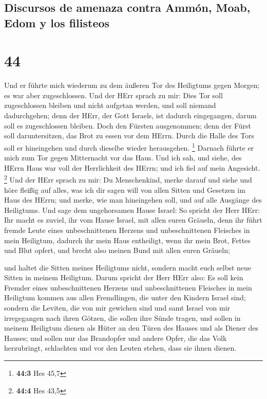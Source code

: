 \hypertarget{discursos-de-amenaza-contra-ammuxf3n-moab-edom-y-los-filisteos}{%
\subsection{Discursos de amenaza contra Ammón, Moab, Edom y los
filisteos}\label{discursos-de-amenaza-contra-ammuxf3n-moab-edom-y-los-filisteos}}

\hypertarget{section-43}{%
\section{44}\label{section-43}}

 Und er führte mich wiederum zu dem äußeren Tor des
Heiligtums gegen Morgen; es war aber zugeschlossen.  Und
der HErr sprach zu mir: Dies Tor soll zugeschlossen bleiben und nicht
aufgetan werden, und soll niemand dadurchgehen; denn der HErr, der Gott
Israels, ist dadurch eingegangen, darum soll es zugeschlossen bleiben.
 Doch den Fürsten ausgenommen; denn der Fürst soll
daruntersitzen, das Brot zu essen vor dem HErrn. Durch die Halle des
Tors soll er hineingehen und durch dieselbe wieder herausgehen.
\footnote{\textbf{44:3} Hes 45,7}  Darnach führte er mich
zum Tor gegen Mitternacht vor das Haus. Und ich sah, und siehe, des
HErrn Haus war voll der Herrlichkeit des HErrn; und ich fiel auf mein
Angesicht. \footnote{\textbf{44:4} Hes 43,5}  Und der HErr
sprach zu mir: Du Menschenkind, merke darauf und siehe und höre fleißig
auf alles, was ich dir sagen will von allen Sitten und Gesetzen im Haus
des HErrn; und merke, wie man hineingehen soll, und auf alle Ausgänge
des Heiligtums.  Und sage dem ungehorsamen Hause Israel:
So spricht der Herr HErr: Ihr macht es zuviel, ihr vom Hause Israel, mit
allen euren Gräueln,  denn ihr führt fremde Leute eines
unbeschnittenen Herzens und unbeschnittenen Fleisches in mein Heiligtum,
dadurch ihr mein Haus entheiligt, wenn ihr mein Brot, Fettes und Blut
opfert, und brecht also meinen Bund mit allen euren Gräueln;

 und haltet die Sitten meines Heiligtums nicht, sondern
macht euch selbst neue Sitten in meinem Heiligtum.  Darum
spricht der Herr HErr also: Es soll kein Fremder eines unbeschnittenen
Herzens und unbeschnittenen Fleisches in mein Heiligtum kommen aus allen
Fremdlingen, die unter den Kindern Israel sind;  sondern
die Leviten, die von mir gewichen sind und samt Israel von mir
irregegangen nach ihren Götzen, die sollen ihre Sünde tragen,
 und sollen in meinem Heiligtum dienen als Hüter an den
Türen des Hauses und als Diener des Hauses; und sollen nur das
Brandopfer und andere Opfer, die das Volk herzubringt, schlachten und
vor den Leuten stehen, dass sie ihnen dienen.

